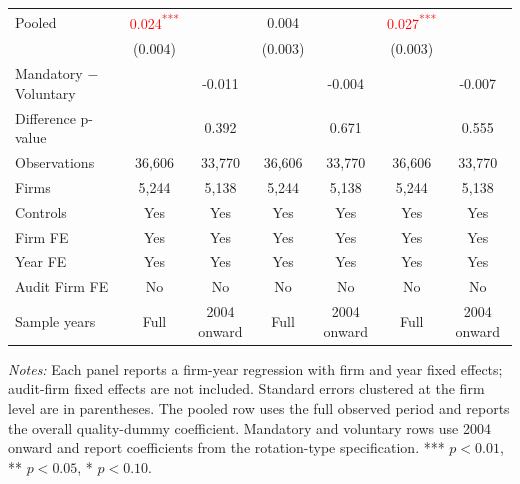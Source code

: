 \documentclass[10pt]{article}
\newcommand{\sym}[1]{\textsuperscript{#1}}
\begin{document}
\begin{minipage}{19cm}
\begin{threeparttable}
\begin{tabular}{l cc cc cc}
Pooled & \textcolor{red}{0.024\sym{***}} &  & 0.004 &  & \textcolor{red}{0.027\sym{***}} &  \\
 & (0.004) &  & (0.003) &  & (0.003) &  \\
Mandatory $-$ Voluntary &  & -0.011 &  & -0.004 &  & -0.007 \\
Difference p-value &  & 0.392 &  & 0.671 &  & 0.555 \\
Observations & 36,606 & 33,770 & 36,606 & 33,770 & 36,606 & 33,770 \\
Firms & 5,244 & 5,138 & 5,244 & 5,138 & 5,244 & 5,138 \\
\midrule
Controls & Yes & Yes & Yes & Yes & Yes & Yes \\
Firm FE & Yes & Yes & Yes & Yes & Yes & Yes \\
Year FE & Yes & Yes & Yes & Yes & Yes & Yes \\
Audit Firm FE & No & No & No & No & No & No \\
Sample years & Full & 2004 onward & Full & 2004 onward & Full & 2004 onward \\
\bottomrule
\end{tabular}
\begin{tablenotes}\fontsize{9}{11}\selectfont
\item \fontsize{9}{11}\selectfont \textit{Notes:} Each panel reports a firm-year regression with firm and year fixed effects; audit-firm fixed effects are not included. Standard errors clustered at the firm level are in parentheses. The pooled row uses the full observed period and reports the overall quality-dummy coefficient. Mandatory and voluntary rows use 2004 onward and report coefficients from the rotation-type specification. *** \(p<0.01\), ** \(p<0.05\), * \(p<0.10\).
\end{tablenotes}
\end{threeparttable}

\end{minipage}
\end{document}
